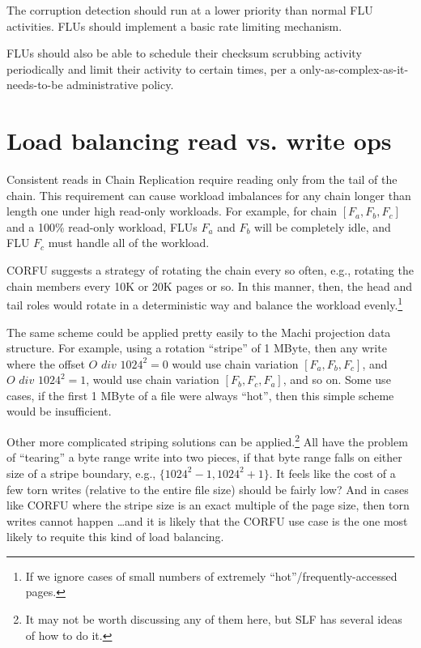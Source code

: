 \documentclass[preprint,10pt]{sigplanconf}
\begin{document}
The corruption detection should run at a lower priority than normal
FLU activities.  FLUs should implement a basic rate limiting
mechanism.

FLUs should also be able to schedule their checksum scrubbing activity
periodically and limit their activity to certain times, per a
only-as-complex-as-it-needs-to-be administrative policy.

\section{Load balancing read vs. write ops}
\label{sec:load-balancing}

Consistent reads in Chain Replication require reading only from the
tail of the chain.  This requirement can cause workload imbalances for
any chain longer than length one under high read-only workloads.  For
example, for chain $[F_a, F_b, F_c]$ and a 100\% read-only workload,
FLUs $F_a$ and $F_b$ will be completely idle, and FLU $F_c$ must
handle all of the workload.

CORFU suggests a strategy of rotating the chain every so often, e.g.,
rotating the chain members every 10K or 20K pages or so.  In this
manner, then, the head and tail roles would rotate in a deterministic
way and balance the workload evenly.\footnote{If we ignore cases of
  small numbers of extremely ``hot''/frequently-accessed pages.}

The same scheme could be applied pretty easily to the Machi projection
data structure.  For example, using a rotation ``stripe'' of 1 MByte, then
any write where the offset $O \textit{ div } 1024^2 = 0$ would use chain
variation $[F_a, F_b, F_c]$, and $O \textit{ div } 1024^2 = 1$, would use chain
variation $[F_b, F_c, F_a]$, and so on.  Some use cases, if the first
1 MByte of a file were always ``hot'', then this simple scheme would be
insufficient.

Other more complicated striping solutions can be applied.\footnote{It
  may not be worth discussing any of them here, but SLF has several
  ideas of how to do it.}  All have the problem of ``tearing'' a byte
range write into two pieces, if that byte range falls on either size
of a stripe boundary, e.g., $\{1024^2 - 1, 1024^2 + 1\}$.  It feels
like the cost of a few torn writes (relative to the entire file size)
should be fairly low?  And in cases like CORFU where the stripe size
is an exact multiple of the page size, then torn writes cannot happen
\ldots and it is likely that the CORFU use case is the one most likely
to requite this kind of load balancing.
\end{document}
